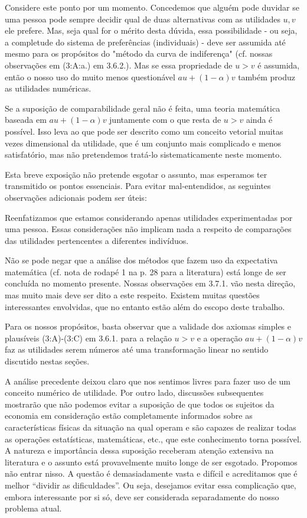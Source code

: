 \documentclass[12pt]{article}
\begin{document}
Considere este ponto por um momento. Concedemos que alguém pode duvidar se uma pessoa pode sempre decidir qual de duas alternativas com as utilidades \( u, v \) ele prefere. Mas, seja qual for o mérito desta dúvida, essa possibilidade - ou seja, a completude do sistema de preferências (individuais) - deve ser assumida até mesmo para os propósitos do "método da curva de indiferença" (cf. nossas observações em (3:A:a.) em 3.6.2.). Mas se essa propriedade de \( u > v \) é assumida, então o nosso uso do muito menos questionável \( au + (1 - \alpha)v \) também produz as utilidades numéricas.

Se a suposição de comparabilidade geral não é feita, uma teoria matemática baseada em \( au + (1 - \alpha)v \) juntamente com o que resta de \( u > v \) ainda é possível. Isso leva ao que pode ser descrito como um conceito vetorial muitas vezes dimensional da utilidade, que é um conjunto mais complicado e menos satisfatório, mas não pretendemos tratá-lo sistematicamente neste momento.

Esta breve exposição não pretende esgotar o assunto, mas esperamos ter transmitido os pontos essenciais. Para evitar mal-entendidos, as seguintes observações adicionais podem ser úteis:

Reenfatizamos que estamos considerando apenas utilidades experimentadas por uma pessoa. Essas considerações não implicam nada a respeito de comparações das utilidades pertencentes a diferentes indivíduos.

Não se pode negar que a análise dos métodos que fazem uso da expectativa matemática (cf. nota de rodapé 1 na p. 28 para a literatura) está longe de ser concluída no momento presente. Nossas observações em 3.7.1. vão nesta direção, mas muito mais deve ser dito a este respeito. Existem muitas questões interessantes envolvidas, que no entanto estão além do escopo deste trabalho.

Para os nossos propósitos, basta observar que a validade dos axiomas simples e plausíveis (3:A)-(3:C) em 3.6.1. para a relação \( u > v \) e a operação \( au + (1 - \alpha)v \) faz as utilidades serem números até uma transformação linear no sentido discutido nestas seções.


A análise precedente deixou claro que nos sentimos livres para fazer uso de um conceito numérico de utilidade. Por outro lado, discussões subsequentes mostrarão que não podemos evitar a suposição de que todos os sujeitos da economia em consideração estão completamente informados sobre as características físicas da situação na qual operam e são capazes de realizar todas as operações estatísticas, matemáticas, etc., que este conhecimento torna possível. A natureza e importância dessa suposição receberam atenção extensiva na literatura e o assunto está provavelmente muito longe de ser esgotado. Propomos não entrar nisso. A questão é demasiadamente vasta e difícil e acreditamos que é melhor ``dividir as dificuldades''. Ou seja, desejamos evitar essa complicação que, embora interessante por si só, deve ser considerada separadamente do nosso problema atual.
\end{document}
